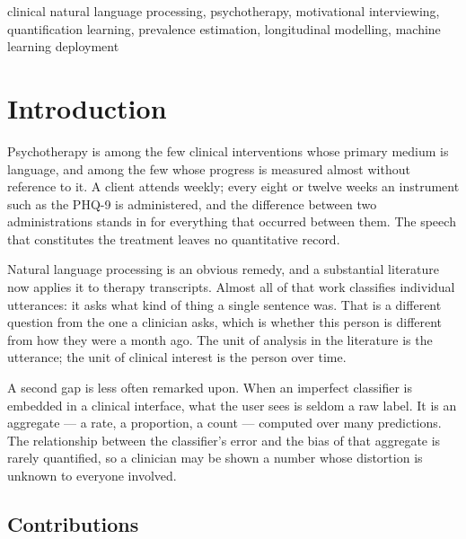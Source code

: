 \documentclass[conference]{IEEEtran}
\begin{document}
\begin{IEEEkeywords}
clinical natural language processing, psychotherapy, motivational
interviewing, quantification learning, prevalence estimation, longitudinal
modelling, machine learning deployment
\end{IEEEkeywords}

\section{Introduction}

Psychotherapy is among the few clinical interventions whose primary medium is
language, and among the few whose progress is measured almost without
reference to it. A client attends weekly; every eight or twelve weeks an
instrument such as the PHQ-9 is administered, and the difference between two
administrations stands in for everything that occurred between them. The
speech that constitutes the treatment leaves no quantitative record.

Natural language processing is an obvious remedy, and a substantial literature
now applies it to therapy transcripts. Almost all of that work classifies
individual utterances: it asks what kind of thing a single sentence was. That
is a different question from the one a clinician asks, which is whether this
person is different from how they were a month ago. The unit of analysis in
the literature is the utterance; the unit of clinical interest is the person
over time.

A second gap is less often remarked upon. When an imperfect classifier is
embedded in a clinical interface, what the user sees is seldom a raw label. It
is an aggregate --- a rate, a proportion, a count --- computed over many
predictions. The relationship between the classifier's error and the bias of
that aggregate is rarely quantified, so a clinician may be shown a number whose
distortion is unknown to everyone involved.

\subsection{Contributions}
\end{document}
